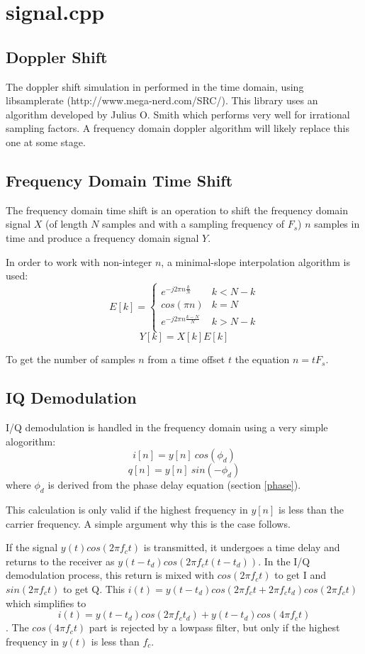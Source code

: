 \documentclass[a4paper,10pt]{article}
\begin{document}
\section {signal.cpp}

\subsection{Doppler Shift}
The doppler shift simulation in performed in the time domain, using libsamplerate (http://www.mega-nerd.com/SRC/). This library uses an algorithm developed by Julius O. Smith\cite{smith} which performs very well for irrational sampling factors. A frequency domain doppler algorithm will likely replace this one at some stage.

\subsection{Frequency Domain Time Shift}
The frequency domain time shift is an operation to shift the frequency domain signal $X$ (of length $N$ samples and with a sampling frequency of $F_s$) $n$ samples in time and produce a frequency domain signal $Y$.

In order to work with non-integer $n$, a minimal-slope interpolation algorithm is used:
\begin{equation*}
E[k]=\begin{cases}
	e^{-j 2 \pi n \frac{k}{N} } & k < N-k \\
	cos(\pi n) & k = N \\
	e^{-j 2 \pi n \frac{k-N}{N} } & k > N-k \\
       \end{cases}
\end{equation*}
$$Y[k]=X[k]E[k]$$

To get the number of samples $n$ from a time offset $t$ the equation $n = t F_s$.

\subsection{IQ Demodulation}

I/Q demodulation is handled in the frequency domain using a very simple alogorithm:
$$i[n] = y[n]~cos(\phi_d)$$
$$q[n] = y[n]~sin(-\phi_d)$$
where $\phi_d$ is derived from the phase delay equation (section \ref{phase}).

This calculation is only valid if the highest frequency in $y[n]$ is less than the carrier frequency. A simple argument why this is the case follows.

If the signal $y(t) cos(2\pi f_c t)$ is transmitted, it undergoes a time delay and returns to the receiver as $y(t-t_d) cos\left(2\pi f_c t (t-t_d)\right)$. In the I/Q demodulation process, this return is mixed with $cos(2\pi f_c t)$ to get I and $sin(2\pi f_c t)$ to get Q. This $i(t) = y(t-t_d) cos(2\pi f_c t + 2\pi f_c t_d) cos(2\pi f_c t)$ which simplifies to
$$i(t) = y(t-t_d) cos(2\pi f_c t_d) + y(t-t_d) cos(4 \pi f_c t)$$.
The $cos(4 \pi f_c t)$ part is rejected by a lowpass filter, but only if the highest frequency in $y(t)$ is less than $f_c$.



\end{document}
